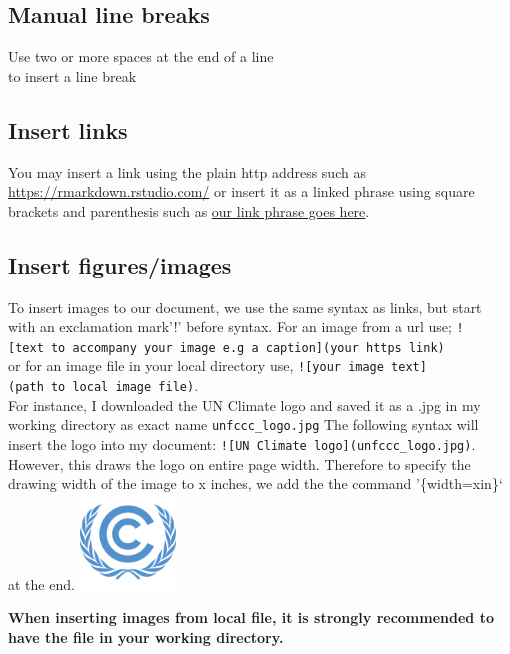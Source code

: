 \documentclass[
]{book}
\begin{document}
\hypertarget{manual-line-breaks}{%
\subsection{Manual line breaks}\label{manual-line-breaks}}

Use two or more spaces at the end of a line\\
to insert a line break

\hypertarget{insert-links}{%
\subsection{Insert links}\label{insert-links}}

You may insert a link using the plain http address such as \url{https://rmarkdown.rstudio.com/} or insert it as a linked phrase using square brackets and parenthesis such as \href{https://rmarkdown.rstudio.com/}{our link phrase goes here}.

\hypertarget{insert-figuresimages}{%
\subsection{Insert figures/images}\label{insert-figuresimages}}

To insert images to our document, we use the same syntax as links, but start with an exclamation mark'!' before syntax.
For an image from a url use; \texttt{!{[}text\ to\ accompany\ your\ image\ e.g\ a\ caption{]}(your\ https\ link)}\\
or for an image file in your local directory use, \texttt{!{[}your\ image\ text{]}(path\ to\ local\ image\ file)}.\\
For instance, I downloaded the UN Climate logo and saved it as a .jpg in my working directory as exact name \texttt{unfccc\_logo.jpg}
The following syntax will insert the logo into my document:
\texttt{!{[}UN\ Climate\ logo{]}(unfccc\_logo.jpg)}. However, this draws the logo on entire page width. Therefore to specify the drawing width of the image to x inches, we add the the command '\{width=xin\}` at the end. \includegraphics[width=1in,height=\textheight]{unfccc_logo.jpg}

\textbf{When inserting images from local file, it is strongly recommended to have the file in your working directory.}
\end{document}
